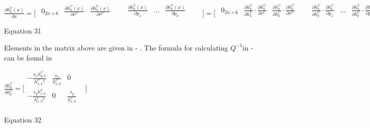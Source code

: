 $\frac{\partial h_{k}^{U}(x)}{\partial x}=\lbrack \begin{matrix}
\begin{matrix}
0_{2n\times 6} & \frac{\partial h_{k}^{U}(x)}{\partial c^{C}} & 
\frac{\partial h_{k}^{U}(x)}{\partial r^{C}} & \\
\end{matrix}
 & \begin{matrix}
\frac{\partial h_{k}^{U}(x)}{\partial p_{1}} & \ldots & \frac{\partial 
h_{k}^{U}(x)}{\partial p_{n}} & \\
\end{matrix}
 & \\
\end{matrix}
\rbrack =\lbrack \begin{matrix}
\begin{matrix}
0_{2n\times 6} & \frac{\partial h_{k}^{U}}{\partial h_{k}^{C}}\cdot 
\frac{\partial h_{k}^{C}}{\partial c^{C}} & \frac{\partial 
h_{k}^{U}}{\partial h_{k}^{C}}\cdot \frac{\partial h_{k}^{C}}{\partial 
r^{C}} & \\
\end{matrix}
 & \begin{matrix}
\frac{\partial h_{k}^{U}}{\partial h_{k}^{C}}\cdot \frac{\partial 
h_{k}^{C}}{\partial p_{1}} & \ldots & \frac{\partial h_{k}^{U}}{\partial 
h_{k}^{C}}\cdot \frac{\partial h_{k}^{C}}{\partial p_{n}} & \\
\end{matrix}
 & \\
\end{matrix}
\rbrack $\\


Equation 31

Elements in the matrix above are given in - . The formula for 
calculating $Q^{-1}$in - can be found in 

\begin{center}$\frac{\partial h_{k}^{U}}{\partial h_{ k}^{C}}= \lbrack 
\begin{matrix}
-\frac{s_{x}h_{y,k}^{C}}{h_{x,k}^{C}^{2}} & \frac{s_{x}}{h_{x,k}^{C}} & 
0 & \\
-\frac{s_{y}h_{z,k}^{C}}{h_{x,k}^{C}^{2}} & 0 & 
\frac{s_{y}}{h_{x,k}^{C}} & \\
\end{matrix}
\rbrack $\\
\end{center}

Equation 32



